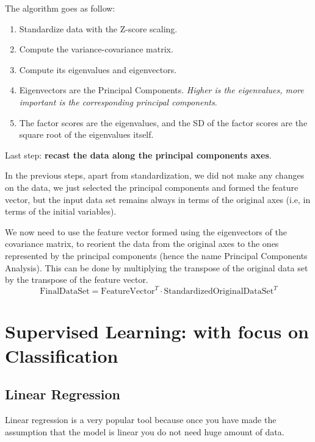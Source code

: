 The algorithm goes as follow:
\begin{enumerate}
    \item Standardize data with the Z-score scaling.
    \item Compute the variance-covariance matrix.
    \item Compute its eigenvalues and eigenvectors.
    \item Eigenvectors are the Principal Components. \textit{Higher is the eigenvalues, more important is the corresponding principal components}.
    \item The factor scores are the eigenvalues, and the SD of the factor scores are the square root of the eigenvalues itself.
\end{enumerate}

Last step: \textbf{recast the data along the principal components axes}.

In the previous steps, apart from standardization, we did not make any changes on the data, we just selected the principal components and formed the feature vector, but the input data set remains always in terms of the original axes (i.e, in terms of the initial variables).

We now need to use the feature vector formed using the eigenvectors of the covariance matrix, to reorient the data from the original axes to the ones represented by the principal components (hence the name Principal Components Analysis). This can be done by multiplying the transpose of the original data set by the transpose of the feature vector.
\begin{equation*}
    \text{FinalDataSet} =\text{FeatureVector}^{T} \cdot \text{StandardizedOriginalDataSet}^{T}
\end{equation*}

\section{Supervised Learning: with focus on Classification}

\subsection{Linear Regression}

Linear regression is a very popular tool because once you have made the assumption that the model is linear you do not need huge amount of data.

